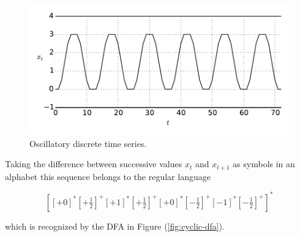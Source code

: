 \documentclass[12pt]{report}
\newcommand{\1}[0]{\mathbbm{1}}
\begin{document}
\begin{figure}[H]
    \centering
    \includegraphics[width=1\textwidth]{img/osc-step.pdf}
    \caption{Oscillatory discrete time series.}
    \label{fig:osc-step}
\end{figure}

Taking the difference between successive values $x_t$ and $x_{t+1}$ 
as symbols in an alphabet this sequence belongs to the regular language

\[
    \left[
        \left[+0\right]^*
        \left[+\tfrac{1}{2}\right]^+
        \left[+1\right]^*
        \left[+\tfrac{1}{2}\right]^+
        \left[+0\right]^*
        \left[-\tfrac{1}{2}\right]^+
        \left[-1\right]^*
        \left[-\tfrac{1}{2}\right]^+
    \right]^*
\]

which is recognized by the \ac{DFA} in Figure (\ref{fig:cyclic-dfa}).
\end{document}
